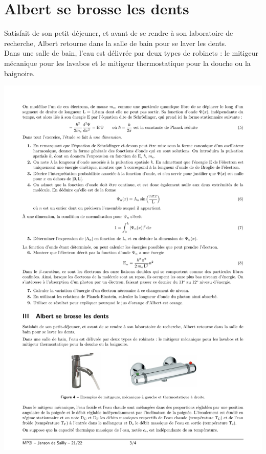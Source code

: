 \documentclass[a4paper,french,bookmarks]{article}
\begin{document}
\section{Albert se brosse les dents}

Satisfait de son petit-déjeuner, et avant de se rendre à son laboratoire de recherche, Albert retourne dans la salle de bain pour se laver les dents.\\[2pt]
%
Dans une salle de bain, l'eau est délivrée par deux types de robinets : le mitigeur mécanique pour les lavabos et le mitigeur thermostatique pour la douche ou la baignoire.

\begin{center}
    \includegraphics[]{dm7fig/mitigeursex.pdf}
	\label{fig:fig4}
\end{center}
\end{document}
